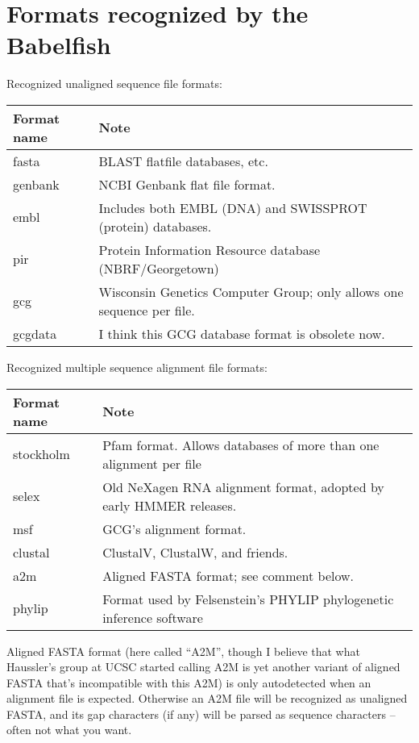 \section{Formats recognized by the Babelfish}

Recognized unaligned sequence file formats:

\begin{tabular}{ll}\hline
Format name   & Note \\ \hline
fasta         & BLAST flatfile databases, etc.\\
genbank       & NCBI Genbank flat file format.\\
embl          & Includes both EMBL (DNA) and SWISSPROT (protein) databases.\\
pir           & Protein Information Resource database (NBRF/Georgetown)\\
gcg           & Wisconsin Genetics Computer Group; only allows one sequence per file.\\
gcgdata       & I think this GCG database format is obsolete now.\\ \hline
\end{tabular}

Recognized multiple sequence alignment file formats:

\begin{tabular}{ll}\hline
Format name   & Note \\ \hline
stockholm     & Pfam format. Allows databases of more than one alignment per file\\
selex         & Old NeXagen RNA alignment format, adopted by early HMMER releases.\\
msf           & GCG's alignment format.\\
clustal       & ClustalV, ClustalW, and friends.\\
a2m           & Aligned FASTA format; see comment below.\\
phylip        & Format used by Felsenstein's PHYLIP phylogenetic inference software\\\hline
\end{tabular}

Aligned FASTA format (here called ``A2M'', though I believe that what
Haussler's group at UCSC started calling A2M is yet another variant of
aligned FASTA that's incompatible with this A2M) is only autodetected
when an alignment file is expected. Otherwise an A2M file will be
recognized as unaligned FASTA, and its gap characters (if any) will be
parsed as sequence characters -- often not what you want.

